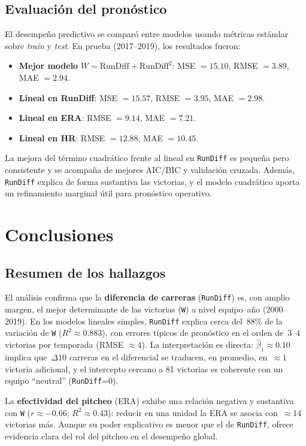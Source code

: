 \documentclass[man,floatsintext]{apa7}
\begin{document}
\subsection{Evaluación del pronóstico}
El desempeño predictivo se comparó entre modelos usando métricas estándar sobre \emph{train} y \emph{test}.
En prueba (2017–2019), los resultados fueron:
\begin{itemize}
    \item \textbf{Mejor modelo} \(W \sim \text{RunDiff} + \text{RunDiff}^2\): MSE \(=15.10\), RMSE \(=3.89\), MAE \(=2.94\).
    \item \textbf{Lineal en RunDiff}: MSE \(=15.57\), RMSE \(=3.95\), MAE \(=2.98\).
    \item \textbf{Lineal en ERA}: RMSE \(=9.14\), MAE \(=7.21\).
    \item \textbf{Lineal en HR}: RMSE \(=12.88\), MAE \(=10.45\).
\end{itemize}
La mejora del término cuadrático frente al lineal en \texttt{RunDiff} es pequeña pero consistente
y se acompaña de mejores AIC/BIC y validación cruzada. Además, \texttt{RunDiff} explica de forma sustantiva las victorias, y el modelo cuadrático aporta un 
refinamiento marginal útil para pronóstico operativo.
\section{Conclusiones}
\subsection{Resumen de los hallazgos}
El análisis confirma que la \textbf{diferencia de carreras} (\texttt{RunDiff}) es, con amplio margen, el mejor determinante de las victorias (\texttt{W}) a nivel equipo–año (2000–2019). En los modelos lineales simples, \texttt{RunDiff} explica cerca del \(\,88\%\) de la variación de \texttt{W} (\(R^2\approx0.883\)), con errores típicos de pronóstico en el orden de \(\,3\text{--}4\) victorias por temporada (RMSE \(\approx 4\)). La interpretación es directa: \(\hat\beta_1\approx 0.10\) implica que \(\,\Delta 10\) carreras en el diferencial se traducen, en promedio, en \(\,\approx 1\) victoria adicional, y el intercepto cercano a 81 victorias es coherente con un equipo ``neutral'' (\texttt{RunDiff}=0).

La \textbf{efectividad del pitcheo} (ERA) exhibe una relación negativa y sustantiva con \texttt{W} (\(r\approx -0.66\); \(R^2\approx 0.43\)): reducir en una unidad la ERA se asocia con \(\,\approx 14\) victorias más. Aunque su poder explicativo es menor que el de \texttt{RunDiff}, ofrece evidencia clara del rol del pitcheo en el desempeño global.
\end{document}
